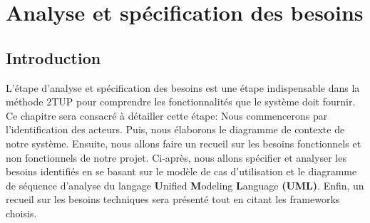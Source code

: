 \vfill 
\chapter{Analyse et spécification des besoins}
\label{chap:analyse-specification-besoins}
\mtcaddchapter
\section*{Introduction}
\justifying
L’étape d’analyse et spécification des besoins est une étape indispensable dans la méthode 2TUP pour comprendre les fonctionnalités que le système doit fournir. Ce chapitre sera consacré à détailler cette étape: Nous commencerons par l’identification des acteurs. Puis, nous élaborons le diagramme de contexte de notre système. Ensuite, nous allons faire un recueil sur  les besoins fonctionnels et non fonctionnels de notre projet. Ci-après, nous allons spécifier et analyser les besoins identifiés en se basant sur le modèle de cas d’utilisation et le diagramme de séquence d'analyse du langage  \textbf{U}nified  \textbf{M}odeling  \textbf{L}anguage \textbf{(UML)}. Enfin, un recueil sur les besoins techniques sera présenté tout en citant les frameworks choisis.


